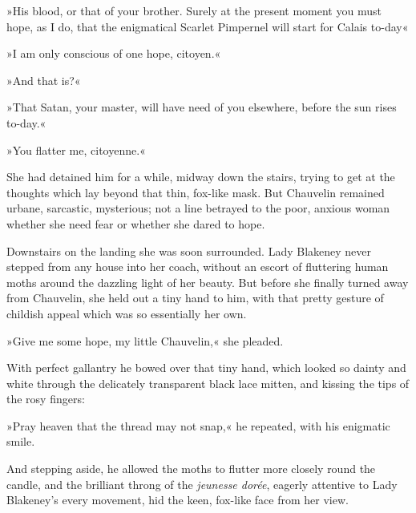 »His blood, or that of your brother. Surely at the present moment you must hope, as I do, that the enigmatical Scarlet Pimpernel will start for Calais to-day\longdash«

»I am only conscious of one hope, citoyen.«

»And that is?«

»That Satan, your master, will have need of you elsewhere, before the sun rises to-day.«

»You flatter me, citoyenne.«

She had detained him for a while, midway down the stairs, trying to get at the thoughts which lay beyond that thin, fox-like mask. But Chauvelin remained urbane, sarcastic, mysterious; not a line betrayed to the poor, anxious woman whether she need fear or whether she dared to hope.

Downstairs on the landing she was soon surrounded. Lady Blakeney never stepped from any house into her coach, without an escort of fluttering human moths around the dazzling light of her beauty. But before she finally turned away from Chauvelin, she held out a tiny hand to him, with that pretty gesture of childish appeal which was so essentially her own.

»Give me some hope, my little Chauvelin,« she pleaded.

With perfect gallantry he bowed over that tiny hand, which looked so dainty and white through the delicately transparent black lace mitten, and kissing the tips of the rosy fingers:\longdash


»Pray heaven that the thread may not snap,« he repeated, with his enigmatic smile.

And stepping aside, he allowed the moths to flutter more closely round the candle, and the brilliant throng of the \textit{jeunesse dorée}, eagerly attentive to Lady Blakeney's every movement, hid the keen, fox-like face from her view.